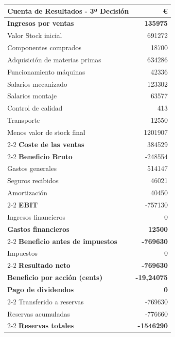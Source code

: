\begin{table}[h]
    \centering
    \begin{tabular}{lr}
        \textbf{Cuenta de Resultados - 3ª Decisión} & \textbf{€} \\
        \hline
        \textbf{Ingresos por ventas}                & \textbf{135975} \\
        Valor Stock inicial                         & 691272 \\
        Componentes comprados                       & 18700 \\
        Adquisición de materias primas              & 634286 \\
        Funcionamiento máquinas                     & 42336 \\
        Salarios mecanizado                         & 123302 \\
        Salarios montaje                            & 63577 \\
        Control de calidad                          & 413 \\
        Transporte                                  & 12550 \\
        Menos valor de stock final                  & 1201907 \\
        \cline{2-2}
        \textbf{Coste de las ventas}                & 384529 \\
        \cline{2-2}
        \textbf{Beneficio Bruto}                    & -248554 \\
        Gastos generales                            & 514147 \\
        Seguros recibidos                           & 46021 \\
        Amortización                                & 40450 \\
        \cline{2-2}
        \textbf{EBIT}                               & -757130 \\
        Ingresos financieros                        & 0 \\
        \textbf{Gastos financieros}                 & \textbf{12500} \\
        \cline{2-2}
        \textbf{Beneficio antes de impuestos}       & \textbf{-769630} \\
        Impuestos                                   & 0 \\
        \cline{2-2}
        \textbf{Resultado neto}                     & \textbf{-769630} \\
        \textbf{Beneficio por acción (cents)}       & \textbf{-19,24075} \\
        \textbf{Pago de dividendos}                 & \textbf{0} \\
        \cline{2-2}
        Transferido a reservas                      & -769630 \\
        Reservas acumuladas                         & -776660 \\
        \cline{2-2}
        \textbf{Reservas totales}                   & \textbf{-1546290}
    \end{tabular}
\end{table}

